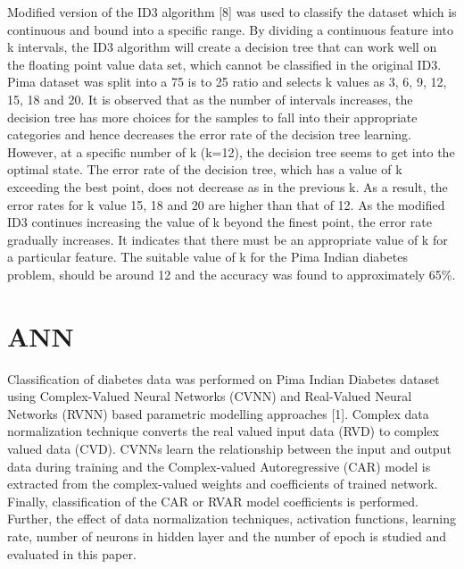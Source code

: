 Modified version of the ID3 algorithm [8] was used to classify the dataset which is continuous and bound into a specific range. By dividing a continuous feature into k intervals, the ID3 algorithm will create a decision tree that can work well on the floating point value data set, which cannot be classified in the original ID3. Pima dataset was split into a 75 is to 25 ratio and selects k values as 3, 6, 9, 12, 15, 18 and 20. It is observed that as the number of intervals increases, the decision tree has more choices for the samples to fall into their appropriate categories and hence decreases the error rate of the decision tree learning. However, at a specific number of k (k=12), the decision tree seems to get into the optimal state. The error rate of the decision tree, which has a value of k exceeding the best point, does not decrease as in the previous k. As a result, the error rates for k value 15, 18 and 20 are higher than that of 12.
As the modified ID3 continues increasing the value of k beyond the finest point, the error rate gradually increases. It indicates that there must be an appropriate value of k for a particular feature. The suitable value of k for the Pima Indian diabetes problem, should be around 12 and the accuracy was found to approximately 65\%.

\section{ANN}
Classification of diabetes data was performed on Pima Indian Diabetes dataset using Complex-Valued Neural Networks (CVNN) and Real-Valued Neural Networks (RVNN) based parametric modelling approaches [1]. Complex data normalization technique converts the real valued input data (RVD) to complex valued data (CVD). CVNNs learn the relationship between the input and output data during training and the Complex-valued Autoregressive (CAR) model is extracted from the complex-valued weights and coefficients of trained network. Finally, classification of the CAR or RVAR model coefficients is performed. Further, the effect of data normalization techniques, activation functions, learning rate, number of neurons in hidden layer and the number of epoch is studied and evaluated in this paper.

